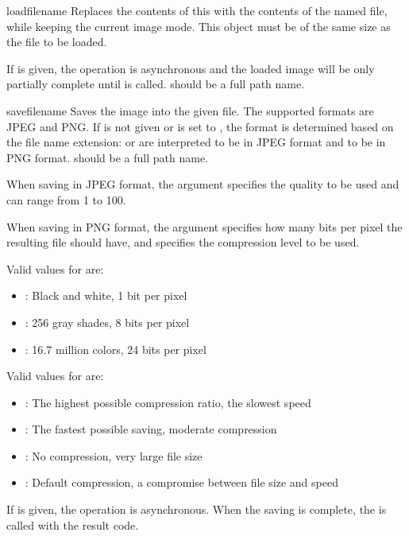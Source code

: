 \begin{methoddesc}[Image]{load}{filename}
\notinfirsted
Replaces the contents of this  with the contents of the named 
file, while keeping the current image mode. This  object must 
be of the same size as the file to be loaded.

If  is given, the operation is asynchronous and the loaded 
image will be only partially complete until  is called. 
 should be a full path name.
\end{methoddesc}

\begin{methoddesc}[Image]{save}{filename}
\notinfirsted
Saves the image into the given file. The supported formats are JPEG and PNG. 
If  is not given or is set to , the format is 
determined based on the file name extension:  or 
 are interpreted to be in JPEG format and  to 
be in PNG format.  should be a full path name.

When saving in JPEG format, the  argument specifies the 
quality to be used and can range from 1 to 100. 

When saving in PNG format, the  argument specifies how many bits 
per pixel the resulting file should have, and  specifies 
the compression level to be used. 

Valid values for  are:

\begin{itemize}
\item {}: Black and white, 1 bit per pixel
\item {}: 256 gray shades, 8 bits per pixel
\item {}: 16.7 million colors, 24 bits per pixel
\end{itemize}

Valid values for  are:

\begin{itemize}
\item {}: The highest possible compression ratio, the slowest speed
\item {}: The fastest possible saving, moderate compression
\item {}: No compression, very large file size
\item {}: Default compression, a compromise between file size and speed 
\end{itemize}

If  is given, the operation is asynchronous. When the 
saving is complete, the  is called with the result code.
\end{methoddesc}


